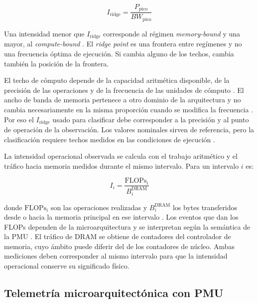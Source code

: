 \begin{equation}
I_{\text{ridge}} =
\frac{P_{\text{pico}}}{BW_{\text{pico}}}
\label{eq:ridge}
\end{equation}

Una intensidad menor que $I_{\text{ridge}}$ corresponde al régimen \textit{memory-bound} y una mayor, al \textit{compute-bound} \cite{Williams2009}. El \textit{ridge point} es una frontera entre regímenes y no una frecuencia óptima de ejecución. Si cambia alguno de los techos, cambia también la posición de la frontera.

El techo de cómputo depende de la capacidad aritmética disponible, de la precisión de las operaciones y de la frecuencia de las unidades de cómputo \cite{Antepara2025}. El ancho de banda de memoria pertenece a otro dominio de la arquitectura y no cambia necesariamente en la misma proporción cuando se modifica la frecuencia \cite{Guerreiro2019,Ali2023}. Por eso el $I_{\text{ridge}}$ usado para clasificar debe corresponder a la precisión y al punto de operación de la observación. Los valores nominales sirven de referencia, pero la clasificación requiere techos medidos en las condiciones de ejecución \cite{NERSC2026}.

La intensidad operacional observada \label{sec:intensidad} se calcula con el trabajo aritmético y el tráfico hacia memoria medidos durante el mismo intervalo. Para un intervalo $i$ es:

\begin{equation}
I_i =
\frac{\text{FLOPs}_i}{B_i^{\text{DRAM}}}
\label{eq:intensidad}
\end{equation} 

donde $\text{FLOPs}_i$ son las operaciones realizadas y $B_i^{\text{DRAM}}$ los bytes transferidos desde o hacia la memoria principal en ese intervalo \cite{Williams2009}. Los eventos que dan los FLOPs dependen de la microarquitectura y se interpretan según la semántica de la PMU \cite{Weaver2008}. El tráfico de DRAM se obtiene de contadores del controlador de memoria, cuyo ámbito puede diferir del de los contadores de núcleo. Ambas mediciones deben corresponder al mismo intervalo para que la intensidad operacional conserve su significado físico.

\subsection{Telemetría microarquitectónica con PMU}
\label{sec:marco-telemetria}

